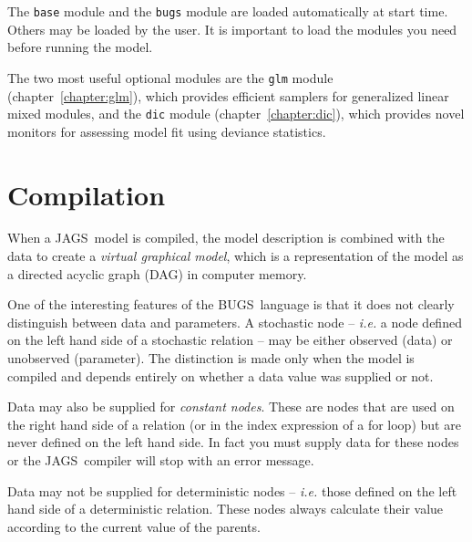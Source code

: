 \documentclass[11pt, a4paper, titlepage]{report}
\newcommand{\JAGS}{\textsf{JAGS}}
\newcommand{\BUGS}{\textsf{BUGS}}
\begin{document}
The \texttt{base} module and the \texttt{bugs} module are loaded
automatically at start time.  Others may be loaded by the user. It is
important to load the modules you need {\rm before} running the model.

The two most useful optional modules are the \texttt{glm} module
(chapter~\ref{chapter:glm}), which provides efficient samplers for
generalized linear mixed modules, and the \texttt{dic} module
(chapter~\ref{chapter:dic}), which provides novel monitors for
assessing model fit using deviance statistics.

\section{Compilation}

When a \JAGS\ model is compiled, the model description is combined
with the data to create a {\em virtual graphical model}, which is a
representation of the model as a directed acyclic graph (DAG) in
computer memory.%

One of the interesting features of the \BUGS\ language is that it does
not clearly distinguish between data and parameters.  A stochastic
node -- {\em i.e.} a node defined on the left hand side of a
stochastic relation -- may be either observed (data) or unobserved
(parameter). The distinction is made only when the model is compiled
and depends entirely on whether a data value was supplied or not.

Data may also be supplied for {\em constant nodes}. These are nodes
that are used on the right hand side of a relation (or in the index
expression of a for loop) but are never defined on the left hand
side. In fact you must supply data for these nodes or the
\JAGS\ compiler will stop with an error message.

Data may not be supplied for deterministic nodes -- {\em i.e.} those
defined on the left hand side of a deterministic relation. These nodes
always calculate their value according to the current value of the
parents. 
\end{document}
